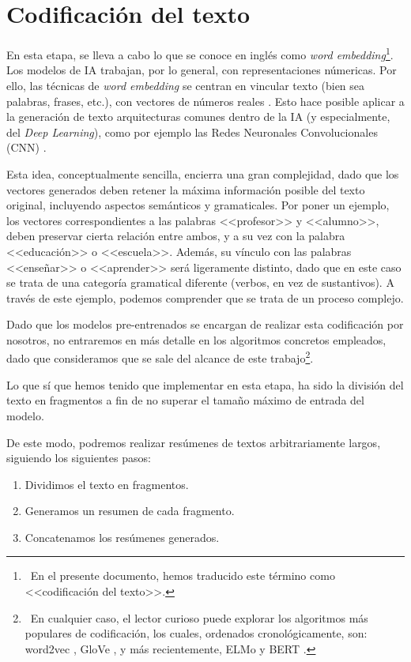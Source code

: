 \bigskip

\section{Codificación del texto} \label{sec:codificacion}

En esta etapa, se lleva a cabo lo que se conoce en inglés como \emph{word embedding}\footnote{\, En el presente documento, hemos traducido este término como <<codificación del texto>>.}. Los modelos de IA trabajan, por lo general, con representaciones númericas. Por ello, las técnicas de \emph{word embedding} se centran en vincular texto (bien sea palabras, frases, etc.), con vectores de números reales \cite{manning19}. Esto hace posible aplicar a la generación de texto arquitecturas comunes dentro de la IA (y especialmente, del \emph{Deep Learning}), como por ejemplo las Redes Neuronales Convolucionales (CNN) \cite{hou20}.

Esta idea, conceptualmente sencilla, encierra una gran complejidad, dado que los vectores generados deben retener la máxima información posible del texto original, incluyendo aspectos semánticos y gramaticales. Por poner un ejemplo, los vectores correspondientes a las palabras <<profesor>> y <<alumno>>, deben preservar cierta relación entre ambos, y a su vez con la palabra <<educación>> o <<escuela>>. Además, su vínculo con las palabras <<enseñar>> o <<aprender>> será ligeramente distinto, dado que en este caso se trata de una categoría gramatical diferente (verbos, en vez de sustantivos). A través de este ejemplo, podemos comprender que se trata de un proceso complejo.

Dado que los modelos pre-entrenados se encargan de realizar esta codificación por nosotros, no entraremos en más detalle en los algoritmos concretos empleados, dado que consideramos que se sale del alcance de este trabajo\footnote{\, En cualquier caso, el lector curioso puede explorar los algoritmos más populares de codificación, los cuales, ordenados cronológicamente, son: word2vec \cite{word2vec1, word2vec2}, GloVe \cite{glove14}, y más recientemente, ELMo \cite{elmo18} y BERT \cite{bert18}.}.

Lo que sí que hemos tenido que implementar en esta etapa, ha sido la división del texto en fragmentos a fin de no superar el tamaño máximo de entrada del modelo.

De este modo, podremos realizar resúmenes de textos arbitrariamente largos, siguiendo los siguientes pasos:

\vspace{-\baselineskip}
\begin{enumerate}
	\tightlist
	\item Dividimos el texto en fragmentos.
	\item Generamos un resumen de cada fragmento.
	\item Concatenamos los resúmenes generados.
\end{enumerate}
\vspace{-0.3cm}

